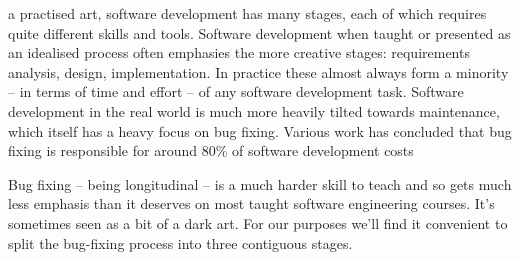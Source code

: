 \documentclass[10pt,journal,compsoc]{IEEEtran}
\begin{document}




% 
% 
% 
% 
 a practised art, software development has many stages, each of which requires quite different skills and tools. Software development when taught or presented as an idealised process often emphasies the more creative stages: requirements analysis, design, implementation. In practice these almost always form a minority -- in terms of time and effort -- of any software development task. Software development in the real world is much more heavily tilted towards maintenance, which itself has a heavy focus on bug fixing. Various work has concluded that bug fixing is responsible for around 80\% of software development costs \cite{nist2002}

Bug fixing -- being longitudinal -- is a much harder skill to teach and so gets much less emphasis than it deserves on most taught software engineering courses. It's sometimes seen as a bit of a dark art. For our purposes we'll find it convenient to split the bug-fixing process into three contiguous stages.
\end{document}
